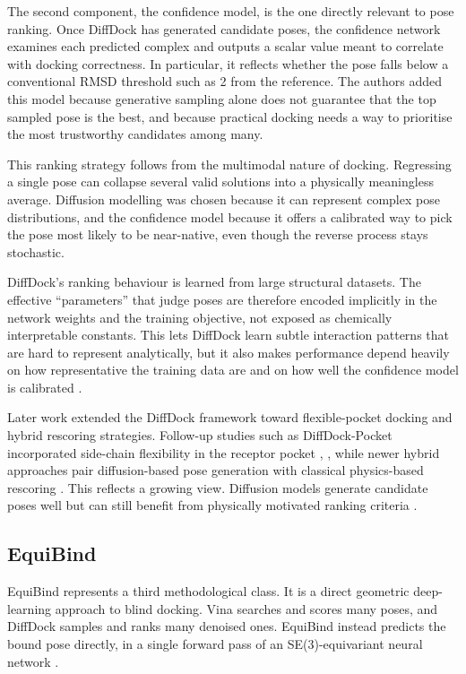 The second component, the confidence model, is the one directly relevant to pose ranking. Once DiffDock has generated candidate poses, the confidence network examines each predicted complex and outputs a scalar value meant to correlate with docking correctness. In particular, it reflects whether the pose falls below a conventional RMSD threshold such as 2\angstrom{} from the reference. The authors added this model because generative sampling alone does not guarantee that the top sampled pose is the best, and because practical docking needs a way to prioritise the most trustworthy candidates among many.

This ranking strategy follows from the multimodal nature of docking. Regressing a single pose can collapse several valid solutions into a physically meaningless average. Diffusion modelling was chosen because it can represent complex pose distributions, and the confidence model because it offers a calibrated way to pick the pose most likely to be near-native, even though the reverse process stays stochastic.

DiffDock's ranking behaviour is learned from large structural datasets. The effective ``parameters'' that judge poses are therefore encoded implicitly in the network weights and the training objective, not exposed as chemically interpretable constants. This lets DiffDock learn subtle interaction patterns that are hard to represent analytically, but it also makes performance depend heavily on how representative the training data are and on how well the confidence model is calibrated \cite{ref024}.

Later work extended the DiffDock framework toward flexible-pocket docking and hybrid rescoring strategies. Follow-up studies such as DiffDock-Pocket incorporated side-chain flexibility in the receptor pocket \cite{ref030}, \cite{ref031}, while newer hybrid approaches pair diffusion-based pose generation with classical physics-based rescoring \cite{ref064}. This reflects a growing view. Diffusion models generate candidate poses well but can still benefit from physically motivated ranking criteria \cite{ref064}.

\hypertarget{equibind-1}{%
\subsection{EquiBind}\label{equibind-1}}

EquiBind represents a third methodological class. It is a direct geometric deep-learning approach to blind docking. Vina searches and scores many poses, and DiffDock samples and ranks many denoised ones. EquiBind instead predicts the bound pose directly, in a single forward pass of an SE(3)-equivariant neural network \cite{ref010}.

